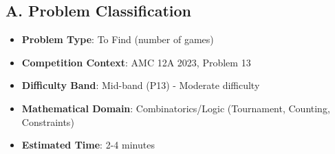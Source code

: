 \documentclass[12pt]{article}
\begin{document}
\begin{problemconfigbox}
\subsection*{A. Problem Classification}
\begin{itemize}[leftmargin=*]
    \item \textbf{Problem Type}: To Find (number of games)
    \item \textbf{Competition Context}: AMC 12A 2023, Problem 13
    \item \textbf{Difficulty Band}: Mid-band (P13) - Moderate difficulty
    \item \textbf{Mathematical Domain}: Combinatorics/Logic (Tournament, Counting, Constraints)
    \item \textbf{Estimated Time}: 2-4 minutes
\end{itemize}


\end{problemconfigbox}
\end{document}
